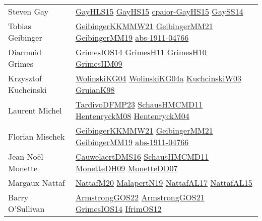 {\begin{longtable}{p{4cm}p{20cm}}
Steven Gay & \href{papers/GayHLS15.pdf}{GayHLS15}\cite{GayHLS15} \href{papers/GayHS15.pdf}{GayHS15}\cite{GayHS15} \href{papers/cpaior-GayHS15.pdf}{cpaior-GayHS15}\cite{cpaior-GayHS15} \href{papers/GaySS14.pdf}{GaySS14}\cite{GaySS14} \\
Tobias Geibinger & \href{papers/GeibingerKKMMW21.pdf}{GeibingerKKMMW21}\cite{GeibingerKKMMW21} \href{papers/GeibingerMM21.pdf}{GeibingerMM21}\cite{GeibingerMM21} \href{papers/GeibingerMM19.pdf}{GeibingerMM19}\cite{GeibingerMM19} \href{articles/abs-1911-04766.pdf}{abs-1911-04766}\cite{abs-1911-04766} \\
Diarmuid Grimes & \href{articles/GrimesIOS14.pdf}{GrimesIOS14}\cite{GrimesIOS14} \href{papers/GrimesH11.pdf}{GrimesH11}\cite{GrimesH11} \href{papers/GrimesH10.pdf}{GrimesH10}\cite{GrimesH10} \href{papers/GrimesHM09.pdf}{GrimesHM09}\cite{GrimesHM09} \\
Krzysztof Kuchcinski & \href{papers/WolinskiKG04.pdf}{WolinskiKG04}\cite{WolinskiKG04} \href{}{WolinskiKG04a}\cite{WolinskiKG04a} \href{articles/KuchcinskiW03.pdf}{KuchcinskiW03}\cite{KuchcinskiW03} \href{papers/GruianK98.pdf}{GruianK98}\cite{GruianK98} \\
Laurent Michel & \href{papers/TardivoDFMP23.pdf}{TardivoDFMP23}\cite{TardivoDFMP23} \href{articles/SchausHMCMD11.pdf}{SchausHMCMD11}\cite{SchausHMCMD11} \href{papers/HentenryckM08.pdf}{HentenryckM08}\cite{HentenryckM08} \href{papers/HentenryckM04.pdf}{HentenryckM04}\cite{HentenryckM04} \\
Florian Mischek & \href{papers/GeibingerKKMMW21.pdf}{GeibingerKKMMW21}\cite{GeibingerKKMMW21} \href{papers/GeibingerMM21.pdf}{GeibingerMM21}\cite{GeibingerMM21} \href{papers/GeibingerMM19.pdf}{GeibingerMM19}\cite{GeibingerMM19} \href{articles/abs-1911-04766.pdf}{abs-1911-04766}\cite{abs-1911-04766} \\
Jean{-}No{\"{e}}l Monette & \href{papers/CauwelaertDMS16.pdf}{CauwelaertDMS16}\cite{CauwelaertDMS16} \href{articles/SchausHMCMD11.pdf}{SchausHMCMD11}\cite{SchausHMCMD11} \href{papers/MonetteDH09.pdf}{MonetteDH09}\cite{MonetteDH09} \href{papers/MonetteDD07.pdf}{MonetteDD07}\cite{MonetteDD07} \\
Margaux Nattaf & \href{papers/NattafM20.pdf}{NattafM20}\cite{NattafM20} \href{papers/MalapertN19.pdf}{MalapertN19}\cite{MalapertN19} \href{articles/NattafAL17.pdf}{NattafAL17}\cite{NattafAL17} \href{articles/NattafAL15.pdf}{NattafAL15}\cite{NattafAL15} \\
Barry O'Sullivan & \href{papers/ArmstrongGOS22.pdf}{ArmstrongGOS22}\cite{ArmstrongGOS22} \href{papers/ArmstrongGOS21.pdf}{ArmstrongGOS21}\cite{ArmstrongGOS21} \href{articles/GrimesIOS14.pdf}{GrimesIOS14}\cite{GrimesIOS14} \href{papers/IfrimOS12.pdf}{IfrimOS12}\cite{IfrimOS12} \\

\end{longtable}}
